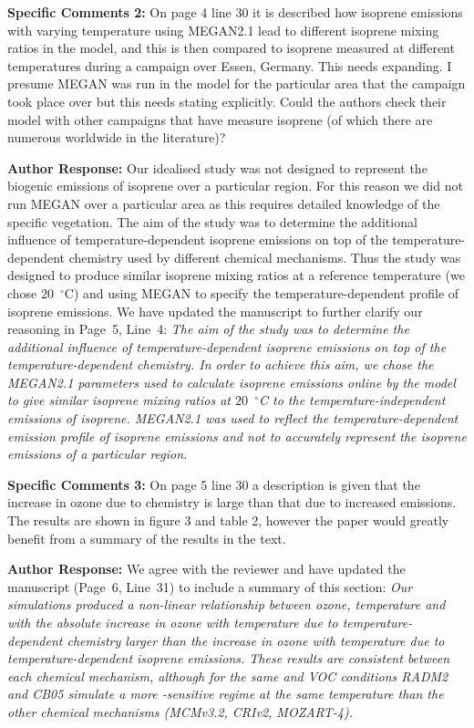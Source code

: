 \documentclass{article}
\DeclareRobustCommand*\degree{\ensuremath{^{\circ}}}
\begin{document}
\textbf{Specific Comments 2:} On page 4 line 30 it is described how isoprene emissions with varying temperature using MEGAN2.1 lead to different isoprene mixing ratios in the model, and this is then compared to isoprene measured at different temperatures during a campaign over Essen, Germany. This needs expanding. I presume MEGAN was run in the model for the particular area that the campaign took place over but this needs stating explicitly.  Could the authors check their model with other campaigns that have measure isoprene (of which there are numerous worldwide in the literature)?

\textbf{Author Response:} Our idealised study was not designed to represent the biogenic emissions of isoprene over a particular region. For this reason we did not run MEGAN over a particular area as this requires detailed knowledge of the specific vegetation. The aim of the study was to determine the additional influence of temperature-dependent isoprene emissions on top of the temperature-dependent chemistry used by different chemical mechanisms. Thus the study was designed to produce similar isoprene mixing ratios at a reference temperature (we chose $20$~\degree C) and using MEGAN to specify the temperature-dependent profile of isoprene emissions. We have updated the manuscript to further clarify our reasoning in Page~5, Line~4:
\textit{
The aim of the study was to determine the additional influence of temperature-dependent isoprene emissions on top of the temperature-dependent chemistry. In order to achieve this aim, we chose the MEGAN2.1 parameters used to calculate isoprene emissions online by the model to give similar isoprene mixing ratios at $20$~\degree C to the temperature-independent emissions of isoprene.
MEGAN2.1 was used to reflect the temperature-dependent emission profile of isoprene emissions and not to accurately represent the isoprene emissions of a particular region.
}

\textbf{Specific Comments 3:} On page 5 line 30 a description is given that the increase in ozone due to chemistry is large than that due to increased emissions. The results are shown in figure 3 and table 2, however the paper would greatly benefit from a summary of the results in the text. 

\textbf{Author Response:} We agree with the reviewer and have updated the manuscript (Page~6, Line~31) to include a summary of this section:
\textit{
Our simulations produced a non-linear relationship between ozone, temperature and  with the absolute increase in ozone with temperature due to temperature-dependent chemistry larger than the increase in ozone with temperature due to temperature-dependent isoprene emissions.
These results are consistent between each chemical mechanism, although for the same  and VOC conditions RADM2 and CB05 simulate a more -sensitive regime at the same temperature than the other chemical mechanisms (MCMv3.2, CRIv2, MOZART-4).
}
\end{document}
